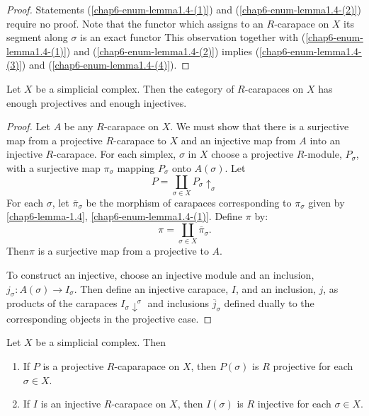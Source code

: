 \begin{proof}
Statements (\ref{chap6-enum-lemma1.4-(1)}) and (\ref{chap6-enum-lemma1.4-(2)}) require no proof. Note that the functor which assigns to an $R$-carapace on $X$ its segment along $\sigma$ is an exact functor This observation together with (\ref{chap6-enum-lemma1.4-(1)}) and (\ref{chap6-enum-lemma1.4-(2)}) implies (\ref{chap6-enum-lemma1.4-(3)}) and (\ref{chap6-enum-lemma1.4-(4)}). 
\end{proof}

\begin{secprop}\label{chap6-prop-1.5}
Let $X$ be a simplicial complex. Then the category of $R$-carapaces on $X$ has enough projectives and enough injectives.
\end{secprop}

\begin{proof}
Let $A$ be any $R$-carapace on $X$. We must show that there is a surjective map from a projective $R$-carapace to $X$ and an injective map from $A$ into an injective $R$-carapace. For each simplex, $\sigma$ in $X$ choose a projective $R$-module, $P_{\sigma}$, with a surjective map $\pi_{\sigma}$ mapping $P_{\sigma}$ onto $A(\sigma)$. Let
$$
P = \coprod\limits_{\sigma \in X}P_{\sigma} \uparrow_{\sigma} 
$$
For each $\sigma$, let $\overline{\pi}_{\sigma}$ be the morphism of carapaces corresponding to $\pi_{\sigma}$ given by \ref{chap6-lemma-1.4}, \ref{chap6-enum-lemma1.4-(1)}. Define $\pi$ by:
$$
\pi = \coprod\limits_{\sigma \in X}\overline{\pi}_{\sigma}.
$$
Then\pageoriginale $\pi$ is a surjective map from a projective to $A$.

To construct an injective, choose an injective module and an inclusion, $j_{\sigma}:A(\sigma) \rightarrow I_{\sigma}$. Then define an injective carapace, $I$, and an inclusion, $j$, as products of the carapaces $I_{\sigma} \downarrow^{\sigma}$ and inclusions $\overline{j}_{\sigma}$ defined dually to the corresponding objects in the projective case. 
\end{proof}

\begin{secprop}\label{chap6-prop-1.6}
Let $X$ be a simplicial complex. Then
    \begin{enumerate}[(1)]
        \item If $P$ is a projective $R$-caparapace on $X$, then $P(\sigma)$ is $R$ projective for each $\sigma\in X$.\label{chap6-prop1.6-enum-(1)}
        \item If $I$ is an injective $R$-carapace on $X$, then $I(\sigma)$ is $R$ injective for each $\sigma \in X$.\label{chap6-prop1.6-enum-(2)}
    \end{enumerate}
\end{secprop}

